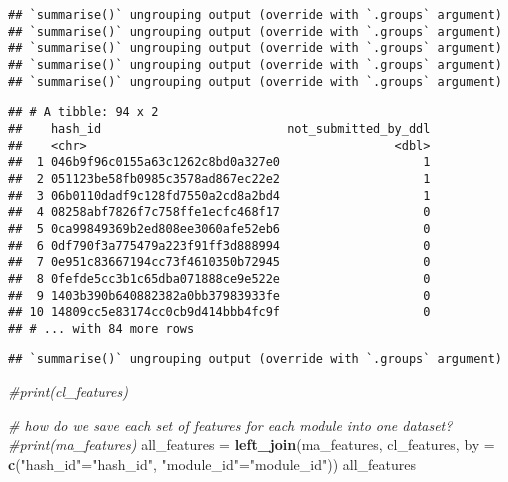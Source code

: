 \documentclass[
]{article}
\newenvironment{Shaded}{\begin{snugshade}}{\end{snugshade}}
\newcommand{\CommentTok}[1]{\textcolor[rgb]{0.56,0.35,0.01}{\textit{#1}}}
\newcommand{\DataTypeTok}[1]{\textcolor[rgb]{0.13,0.29,0.53}{#1}}
\newcommand{\KeywordTok}[1]{\textcolor[rgb]{0.13,0.29,0.53}{\textbf{#1}}}
\newcommand{\NormalTok}[1]{#1}
\newcommand{\StringTok}[1]{\textcolor[rgb]{0.31,0.60,0.02}{#1}}
\begin{document}
\begin{verbatim}
## `summarise()` ungrouping output (override with `.groups` argument)
## `summarise()` ungrouping output (override with `.groups` argument)
## `summarise()` ungrouping output (override with `.groups` argument)
## `summarise()` ungrouping output (override with `.groups` argument)
## `summarise()` ungrouping output (override with `.groups` argument)
\end{verbatim}

\begin{verbatim}
## # A tibble: 94 x 2
##    hash_id                          not_submitted_by_ddl
##    <chr>                                           <dbl>
##  1 046b9f96c0155a63c1262c8bd0a327e0                    1
##  2 051123be58fb0985c3578ad867ec22e2                    1
##  3 06b0110dadf9c128fd7550a2cd8a2bd4                    1
##  4 08258abf7826f7c758ffe1ecfc468f17                    0
##  5 0ca99849369b2ed808ee3060afe52eb6                    0
##  6 0df790f3a775479a223f91ff3d888994                    0
##  7 0e951c83667194cc73f4610350b72945                    0
##  8 0fefde5cc3b1c65dba071888ce9e522e                    0
##  9 1403b390b640882382a0bb37983933fe                    0
## 10 14809cc5e83174cc0cb9d414bbb4fc9f                    0
## # ... with 84 more rows
\end{verbatim}

\begin{verbatim}
## `summarise()` ungrouping output (override with `.groups` argument)
\end{verbatim}

\begin{Shaded}
\begin{Highlighting}[]
\CommentTok{#print(cl_features)}

\CommentTok{# how do we save each set of features for each module into one dataset? }
\CommentTok{#print(ma_features)}
\NormalTok{all_features =}\StringTok{ }\KeywordTok{left_join}\NormalTok{(ma_features, cl_features, }\DataTypeTok{by =} \KeywordTok{c}\NormalTok{(}\StringTok{"hash_id"}\NormalTok{=}\StringTok{"hash_id"}\NormalTok{, }\StringTok{"module_id"}\NormalTok{=}\StringTok{"module_id"}\NormalTok{))}
\NormalTok{all_features}
\end{Highlighting}
\end{Shaded}
\end{document}
